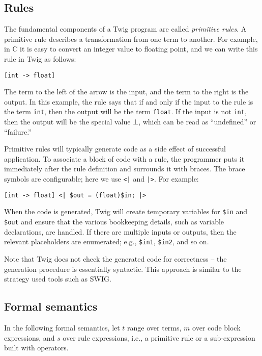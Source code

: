 \subsection{Rules}
\label{sec:rules}

The fundamental components of a Twig program are called
\emph{primitive rules}. A primitive rule describes a
transformation from one term to another. For example, in C it is
easy to convert an integer value to floating point, and we can
write this rule in Twig as follows:

\begin{verbatim}
[int -> float]
\end{verbatim}

The term to the left of the arrow is the input, and the term to
the right is the output. In this example, the rule says that if
and only if the input to the rule is the term \texttt{int}, then
the output will be the term \texttt{float}. If the input is not
\texttt{int}, then the output will be the special value $\bot$,
which can be read as ``undefined'' or ``failure.''

Primitive rules will typically generate code as a side effect of
successful application. To associate a block of code with a rule,
the programmer puts it immediately after the rule definition and
surrounds it with braces. The brace symbols are configurable; here
we use \texttt{<|} and \texttt{|>}. For example:

\begin{verbatim}
[int -> float] <| $out = (float)$in; |>
\end{verbatim}

When the code is generated, Twig will create temporary variables
for \texttt{\$in} and \texttt{\$out} and ensure that the various
bookkeeping details, such as variable declarations, are handled.
If there are multiple inputs or outputs, then the relevant
placeholders are enumerated; e.g., \texttt{\$in1}, \texttt{\$in2},
and so on.

Note that Twig does not check the generated code for correctness
-- the generation procedure is essentially syntactic. This
approach is similar to the strategy used tools such as
SWIG\cite{swig}.

\subsection{Formal semantics}

In the following formal semantics, let $t$ range over terms, $m$
over code block expressions, and $s$ over rule expressions, i.e.,
a primitive rule or a sub-expression built with operators.

